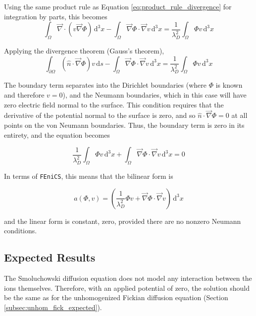Using the same product rule as Equation \ref{eq:product_rule_divergence} for integration by parts, this becomes
\begin{equation}
  \int_{\Omega} \vec{\nabla} \cdot \left( v \vec{\nabla} \Phi \right) \,\mathrm{d}^3x
  - \int_{\Omega} \vec{\nabla}\Phi \cdot \vec{\nabla}v \,\mathrm{d}^3x
  = \frac{1}{\lambda_D^2} \int_{\Omega} \Phi v \,\mathrm{d}^3x
\end{equation}

Applying the divergence theorem (Gauss's theorem),
\begin{equation}
  \int_{\partial\Omega} \left( \hat{n} \cdot \vec{\nabla} \Phi \right) v \,\mathrm{d}s
  - \int_{\Omega} \vec{\nabla}\Phi \cdot \vec{\nabla}v \,\mathrm{d}^3x
  = \frac{1}{\lambda_D^2} \int_{\Omega} \Phi v \,\mathrm{d}^3x
\end{equation}

The boundary term separates into the Dirichlet boundaries (where $\Phi$ is known and therefore $v=0$),
and the Neumann boundaries, which in this case will have zero electric field normal to the surface.
This condition requires that the derivative of the potential normal to the surface is zero,
and so $\hat{n} \cdot \vec{\nabla} \Phi = 0$ at all points on the von Neumann boundaries.
Thus, the boundary term is zero in its entirety, and the equation becomes

\begin{equation}
  \frac{1}{\lambda_D^2} \int_{\Omega} \Phi v \,\mathrm{d}^3x
  + \int_{\Omega} \vec{\nabla}\Phi \cdot \vec{\nabla}v \,\mathrm{d}^3x
  = 0
\end{equation}

In terms of \texttt{FEniCS}, this means that the bilinear form is

\begin{equation}
  \boxed{
    a(\Phi,v)=\left(\frac{1}{\lambda_D^2} \Phi v  + \vec{\nabla}\Phi \cdot \vec{\nabla}v \right) \,\mathrm{d}^3x
  }
\end{equation}

and the linear form is constant, zero, provided there are no nonzero Neumann conditions.

\subsection{Expected Results}\label{subsec:unhom_smol_expected}

The Smoluchowski diffusion equation does not model any interaction between the ions themselves.
Therefore, with an applied potential of zero,
the solution should be the same as for the
unhomogenized Fickian diffusion equation (Section \ref{subsec:unhom_fick_expected}).

